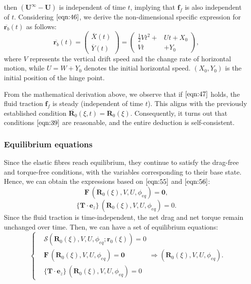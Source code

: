 \documentclass[lineno]{JFM-FLM_Au}
\begin{document}
then $(\mathbf{U}^{\infty}-\mathbf{U})$ is independent of time $t$, implying that $\mathbf{f}_{f}$ is also independent of $t$.
Considering $\eqref{eqn:46}$, we derive the non-dimensional specific expression for $\overline{\mathbf{r}_b}(t)$ as follows:
\begin{equation}
	\label{eqn:47}
	\overline{\mathbf{r}_b}(t)=\left(\begin{aligned}
		\overline{X}(t)\\
		\overline{Y}(t)
	\end{aligned}\right)=\left(\begin{aligned}
		\frac{1}{2}V t^2+&Ut+X_0\\
		Vt&+Y_0
	\end{aligned}\right),
\end{equation}
where $V$ represents the vertical drift speed and the change rate  of horizontal motion, while $U=W+Y_0$ denotes the initial horizontal speed. $(X_0, Y_0)$ is the initial position of the hinge point.

From the mathematical derivation above, we observe that if $\eqref{eqn:47}$ holds, the fluid traction $\mathbf{f}_{f}$ is steady (independent of time $t$). This aligns with the previously established condition $\overline{\mathbf{R}_0}(\xi,t)=\mathbf{R}_0(\xi)$. Consequently, it turns out that conditions $\eqref{eqn:39}$ are reasonable, and the entire deduction is self-consistent.


\subsubsection{Equilibrium equations}
Since the elastic fibres reach equilibrium, they continue to satisfy the drag-free and torque-free conditions, with the variables corresponding to their base state. Hence, we can obtain the expressions based on $\eqref{eqn:55}$ and $\eqref{eqn:56}$:
\begin{equation}
	\label{eqn:120}
	\mathbf{F}\,(\mathbf{R}_0(\xi), V, U, \phi_{eq})=\mathbf{0},
\end{equation}
\begin{equation}
	\label{eqn:121}
	\{\mathbf{T}\cdot\mathbf{e}_z\}\,(\mathbf{R}_0(\xi), V, U, \phi_{eq})=0.
\end{equation}
Since the fluid traction is time-independent, the net drag and net torque remain unchanged over time. Then, we can have a set of equilibrium equations:
\begin{equation}
	\label{eqn:122}
	\left\{\begin{aligned}
		&\mathbf{\mathcal{S}}\left(\mathbf{R}_0(\xi), V, U,\phi_{eq};\mathbf{r}_0(\xi)\right)=0\\
		&\mathbf{F}\,(\mathbf{R}_0(\xi), V, U, \phi_{eq})=\mathbf{0}\\
		&\{\mathbf{T}\cdot\mathbf{e}_z\}\,(\mathbf{R}_0(\xi), V, U, \phi_{eq})=0
	\end{aligned}\right.\Longrightarrow \left(\mathbf{R}_0(\xi), V, U, \phi_{eq}\right).
\end{equation}
\end{document}
